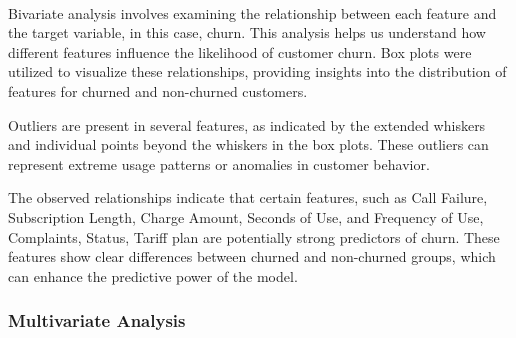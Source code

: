 \documentclass[11pt]{article}
\begin{document}
    \begin{center}
    \end{center}
    { \hspace*{\fill} \\}
    
    Bivariate analysis involves examining the relationship between each
feature and the target variable, in this case, churn. This analysis
helps us understand how different features influence the likelihood of
customer churn. Box plots were utilized to visualize these
relationships, providing insights into the distribution of features for
churned and non-churned customers.

Outliers are present in several features, as indicated by the extended
whiskers and individual points beyond the whiskers in the box plots.
These outliers can represent extreme usage patterns or anomalies in
customer behavior.

The observed relationships indicate that certain features, such as Call
Failure, Subscription Length, Charge Amount, Seconds of Use, and
Frequency of Use, Complaints, Status, Tariff plan are potentially strong
predictors of churn. These features show clear differences between
churned and non-churned groups, which can enhance the predictive power
of the model.

    \subsubsection{Multivariate Analysis}\label{multivariate-analysis}
\end{document}
